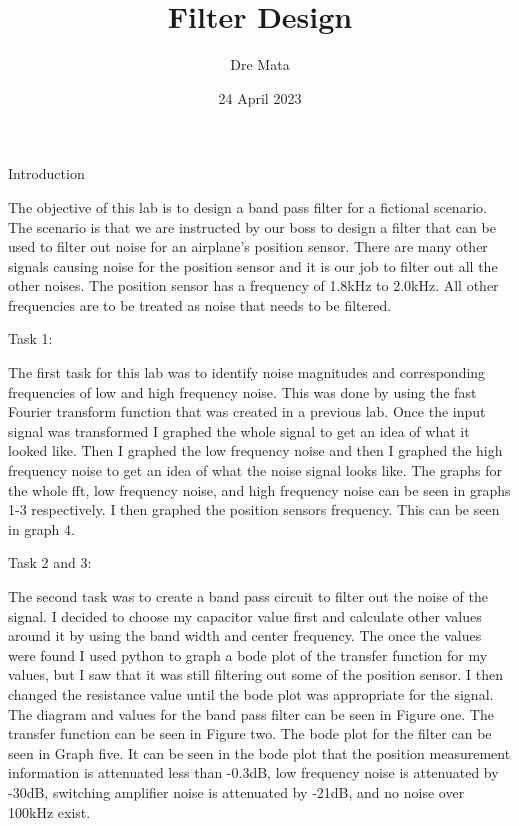 \documentclass[nobib]{MSword}
\title{Filter Design}
\author{Dre Mata}
\date{24 April 2023}
\begin{document}
\maketitle
\begin{center}
    Introduction
\end{center}
The objective of this lab is to design a band pass filter for a fictional scenario. The scenario is that we are instructed by our boss to design a filter that can be used to filter out noise for an airplane's position sensor. There are many other signals causing noise for the position sensor and it is our job to filter out all the other noises. The position sensor has a frequency of 1.8kHz to 2.0kHz. All other frequencies are to be treated as noise that needs to be filtered. 

\begin{center}
    Task 1:
\end{center}
The first task for this lab was to identify noise magnitudes and corresponding frequencies of low and high frequency noise. This was done by using the fast Fourier transform function that was created in a previous lab. Once the input signal was transformed I graphed the whole signal to get an idea of what it looked like. Then I graphed the low frequency noise and then I graphed the high frequency noise to get an idea of what the noise signal looks like. The graphs for the whole fft, low frequency noise, and high frequency noise can be seen in graphs 1-3 respectively. I then graphed the position sensors frequency. This can be seen in graph 4.

\begin{center}
    Task 2 and 3:
\end{center}
The second task was to create a band pass circuit to filter out the noise of the signal. I decided to choose my capacitor value first and calculate other values around it by using the band width and center frequency. The once the values were found I used python to graph a bode plot of the transfer function for my values, but I saw that it was still filtering out some of the position sensor. I then changed the resistance value until the bode plot was appropriate for the signal. The diagram and values for the band pass filter can be seen in Figure one. The transfer function can be seen in Figure two. The bode plot for the filter can be seen in Graph five. It can be seen in the bode plot that the position measurement information is attenuated less than -0.3dB, low frequency noise is attenuated by -30dB, switching amplifier noise is attenuated by -21dB, and no noise over 100kHz exist. 
\end{document}

